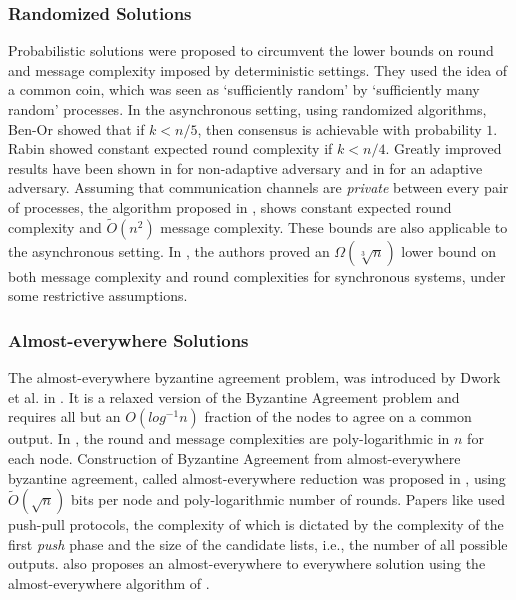 \subsubsection{Randomized Solutions}
Probabilistic solutions were proposed to circumvent the lower bounds on round and message complexity imposed by deterministic settings. They used the idea of a common coin, which was seen as `sufficiently random' by `sufficiently many random' processes. 
In the asynchronous setting, using randomized algorithms, Ben-Or \cite{Ben-Or83} showed that if $k < n/5$, then consensus is achievable with probability $1$. Rabin \cite{Rabin83} showed constant expected round complexity if $k < n/4$. Greatly improved results have been shown in \cite{PCR14, KKKSS08, MHR14} for non-adaptive adversary and in \cite{KS13,AAKS14} for an adaptive adversary. Assuming that communication channels are \textit{private} between every pair of processes, the algorithm proposed in \cite{PR10}, shows constant expected round complexity and $\tilde{O}(n^2)$ message complexity. These bounds are also applicable to the asynchronous setting. In \cite{HKK08}, the authors proved an $\Omega(\sqrt[3]{n})$ lower bound on both message complexity and round complexities for synchronous systems, under some restrictive assumptions.

\subsubsection{Almost-everywhere Solutions}
The almost-everywhere byzantine agreement problem, was introduced by Dwork et al. in \cite{DPPU88}. It is a relaxed version of the Byzantine Agreement problem and requires all but an $O(log^{-1}n)$ fraction of the nodes to agree on a common output. In \cite{KSSV06}, the round and message complexities are poly-logarithmic in $n$ for each node. Construction of Byzantine Agreement from almost-everywhere byzantine agreement, called almost-everywhere reduction was proposed in \cite{KS09,KLST11}, using $\tilde{O}(\sqrt{n})$ bits per node and poly-logarithmic number of rounds. 
Papers like \cite{KLST11} used push-pull protocols, the complexity of which is dictated by the complexity of the first \textit{push} phase and the size of the candidate lists, i.e., the number of all possible outputs. \cite{BGH13}  also proposes an almost-everywhere to everywhere solution using the almost-everywhere algorithm of \cite{KSSV06}.

